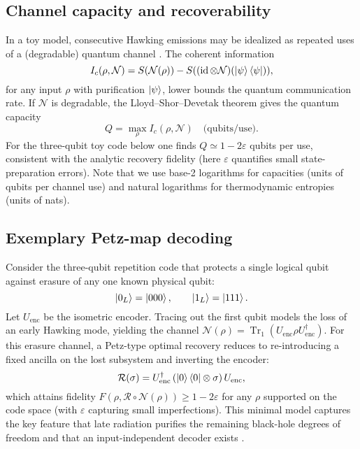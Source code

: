 \documentclass[12pt, numbers, sort&compress]{article}
\begin{document}
\subsection{Channel capacity and recoverability}
In a toy model, consecutive Hawking emissions may be idealized as repeated uses of a (degradable) quantum channel \cite{Lloyd:1997,LloydShorDevetak}. The coherent information
\begin{equation}
I_c(\rho,\mathcal{N}) = S(\mathcal{N}(\rho)) - S((\operatorname{id}\otimes\mathcal{N})(\ket{\psi}\bra{\psi})),
\end{equation}
for any input $\rho$ with purification $\ket{\psi}$, lower bounds the quantum communication rate. If $\mathcal{N}$ is degradable, the Lloyd–Shor–Devetak theorem gives the quantum capacity
\begin{equation}
Q = \max_{\rho} I_c(\rho,\mathcal{N}) \quad \text{(qubits/use)}.
\end{equation}
For the three-qubit toy code below one finds $Q\simeq 1-2\varepsilon$ qubits per use, consistent with the analytic recovery fidelity (here $\varepsilon$ quantifies small state-preparation errors). Note that we use base-2 logarithms for capacities (units of qubits per channel use) and natural logarithms for thermodynamic entropies (units of nats).

\subsection{Exemplary Petz-map decoding}\label{subsec:petz}
Consider the three-qubit repetition code that protects a single logical qubit against erasure of any one known physical qubit:
\begin{equation}
\ket{0_L}=\ket{000}, \qquad \ket{1_L}=\ket{111}.
\end{equation}
Let $U_{\text{enc}}$ be the isometric encoder. Tracing out the first qubit models the loss of an early Hawking mode, yielding the channel
$  \mathcal{N}(\rho) = \operatorname{Tr}_{1}\left(U_{\text{enc}}\rho U_{\text{enc}}^{\dagger}\right).$
For this erasure channel, a Petz-type optimal recovery reduces to re-introducing a fixed ancilla on the lost subsystem and inverting the encoder:
$$
  \mathcal{R}(\sigma) = U_{\text{enc}}^{\dagger}
  \left(\ket{0}\bra{0}\otimes \sigma\right)
  U_{\text{enc}},
$$
which attains fidelity
$  F(\rho, \mathcal{R}\circ\mathcal{N}(\rho)) \ge 1 - 2\varepsilon$
for any $\rho$ supported on the code space (with $\varepsilon$ capturing small imperfections). This minimal model captures the key feature that late radiation purifies the remaining black-hole degrees of freedom and that an input-independent decoder exists \cite{NielsenChuang2010}.
\end{document}
